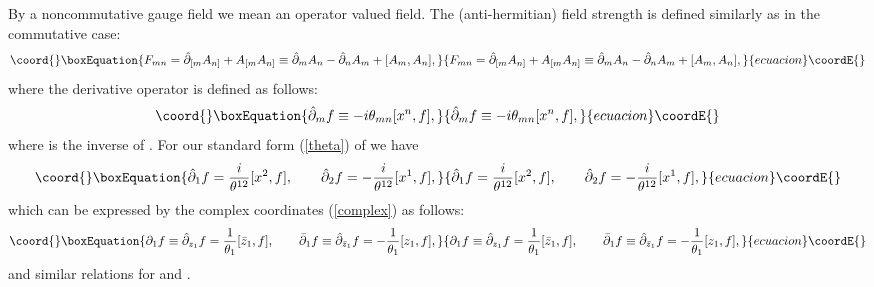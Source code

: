 \documentclass[a4paper,a4paper]{article}
\begin{document}
By a noncommutative gauge field \coordHE{} we mean an operator valued
field. The (anti-hermitian) field strength \coordHE{} is defined
similarly as in the commutative case:
\begin{equation}\coord{}\boxEquation{
\label{F by A} F_{mn}=\hat\partial_{[m} A_{n]} + A_{[m} A_{n]}
\equiv \hat\partial_m A_n - \hat\partial_n A_m + [A_m, A_n],
}{
F_{mn}=\hat\partial_{[m} A_{n]} + A_{[m} A_{n]}
\equiv \hat\partial_m A_n - \hat\partial_n A_m + [A_m, A_n],
}{ecuacion}\coordE{}\end{equation}
where the derivative operator \coordHE{} is defined as
follows:
\begin{equation}\coord{}\boxEquation{
\hat\partial_m f \equiv - i \theta_{mn} [x^n, f],
}{
\hat\partial_m f \equiv - i \theta_{mn} [x^n, f],
}{ecuacion}\coordE{}\end{equation}
where \coordHE{} is the inverse of \coordHE{}. For our
standard form (\ref{theta}) of \coordHE{} we have
\begin{equation}\coord{}\boxEquation{
\hat\partial_1 f = {i \over \theta^{12}} [x^2,f], \qquad
\hat\partial_2 f = - {i \over \theta^{12}} [x^1,f],
}{
\hat\partial_1 f = {i \over \theta^{12}} [x^2,f], \qquad
\hat\partial_2 f = - {i \over \theta^{12}} [x^1,f],
}{ecuacion}\coordE{}\end{equation}
which can be expressed by the complex coordinates (\ref{complex})
as follows:
\begin{equation}\coord{}\boxEquation{
\partial_1 f \equiv \hat\partial_{z_1}f = {1\over\theta_1}
[\bar z_1, f], \qquad \bar\partial_1 f \equiv \hat\partial_{\bar
z_1}f = - {1\over\theta_1}[z_1, f],
}{
\partial_1 f \equiv \hat\partial_{z_1}f = {1\over\theta_1}
[\bar z_1, f], \qquad \bar\partial_1 f \equiv \hat\partial_{\bar
z_1}f = - {1\over\theta_1}[z_1, f],
}{ecuacion}\coordE{}\end{equation}
and similar relations for \coordHE{} and \coordHE{}.
\end{document}

